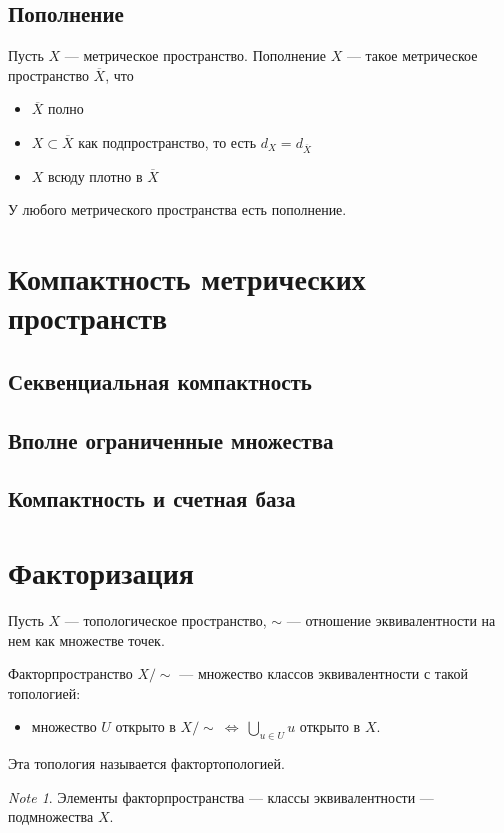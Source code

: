 \documentclass[11pt]{book}
\theoremstyle{definition}
\theoremstyle{plain}
\theoremstyle{plain}
\theoremstyle{definition}
\theoremstyle{remark}
\newtheorem*{note}{Note}
\begin{document}
\subsection{Пополнение}
\begin{defn}
    Пусть $ X$ --- метрическое пространство. Пополнение  $ X$ --- такое метрическое пространство  $ \overline{X}$, что 
    \begin{itemize}
	\item $ \overline{X}$ полно
	\item $ X \subset \overline{X}$ как подпространство, то есть $ d_X = d_{\overline{X}}$ 
	\item $ X$ всюду плотно в  $ \overline{X}$
    \end{itemize}
\end{defn}
\begin{thm}
    У любого метрического пространства есть пополнение.
\end{thm}
\section{Компактность метрических пространств}
\subsection{Секвенциальная компактность}
\subsection{Вполне ограниченные множества}
\subsection{Компактность и счетная база}
\section{Факторизация}
\begin{defn}
    Пусть $ X$ --- топологическое пространство, $ \sim $ --- отношение эквивалентности на нем как множестве точек.

    Факторпространство $ X/\!\sim $ --- множество классов эквивалентности с такой топологией:
    \begin{itemize}
	\item  множество $ U$ открыто в $ X/\!\sim ~\Longleftrightarrow ~\bigcup_{u \in  U} u$ открыто в $ X$.
    \end{itemize}
    Эта топология называется фактортопологией.
\end{defn}
\begin{note}
    Элементы факторпространства --- классы эквивалентности  --- подмножества $ X$.
\end{note}
\end{document}
